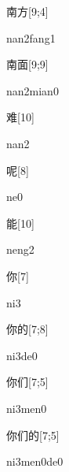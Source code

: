 \begin{verbete}{南方}[9;4]
\begin{pronuncia}{nan2fang1}
\end{pronuncia}
\end{verbete}

\begin{verbete}{南面}[9;9]
\begin{pronuncia}{nan2mian0}
\end{pronuncia}
\end{verbete}

\begin{verbete}[nan2]{难}[10]
\begin{pronuncia}{nan2}
\end{pronuncia}
\end{verbete}

\begin{verbete}[ne0]{呢}[8]
\begin{pronuncia}{ne0}
\end{pronuncia}
\end{verbete}

\begin{verbete}[neng2]{能}[10]
\begin{pronuncia}{neng2}
\end{pronuncia}
\end{verbete}

\begin{verbete}[ni3]{你}[7]
\begin{pronuncia}{ni3}
\end{pronuncia}
\end{verbete}

\begin{verbete}[ni3de0]{你的}[7;8]
\begin{pronuncia}{ni3de0}
\end{pronuncia}
\end{verbete}

\begin{verbete}[ni3men0]{你们}[7;5]
\begin{pronuncia}{ni3men0}
\end{pronuncia}
\end{verbete}

\begin{verbete}[ni3men0de0]{你们的}[7;5]
\begin{pronuncia}{ni3men0de0}
\end{pronuncia}
\end{verbete}


